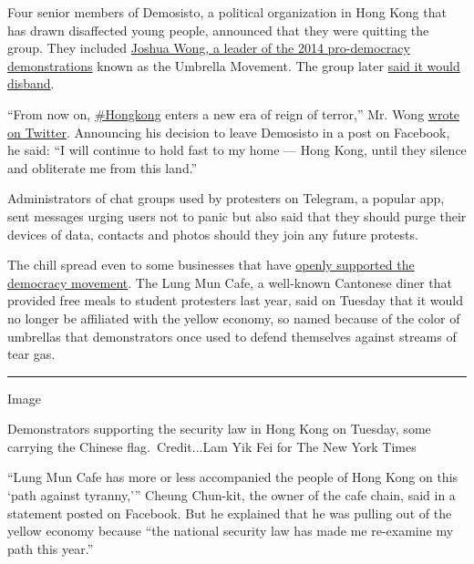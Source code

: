 Four senior members of Demosisto, a political organization in Hong Kong
that has drawn disaffected young people, announced that they were
quitting the group. They included
\href{https://www.nytimes3xbfgragh.onion/2019/10/29/world/asia/joshua-wong-hong-kong-protests.html}{Joshua
Wong, a leader of the 2014 pro-democracy demonstrations} known as the
Umbrella Movement. The group later
\href{https://www.facebookcorewwwi.onion/demosisto/posts/1464823310393153}{said
it would disband}.

``From now on,
\href{https://twitter.com/hashtag/Hongkong?ref_src=twsrc\%5Etfw\%7Ctwcamp\%5Etweetembed\%7Ctwterm\%5E1277794270393643008\%7Ctwgr\%5E\&ref_url=https\%3A\%2F\%2Fscoop.nyt.net\%2Fui\%2Foakarticle\%2F100000007213051\%2Fweb\%2FdqV1egMG0LchnIJbEkRn\&src=hashtag_click}{\#Hongkong}
enters a new era of reign of terror,'' Mr. Wong
\href{https://twitter.com/joshuawongcf/status/1277794270393643008}{wrote
on Twitter}. Announcing his decision to leave Demosisto in a post on
Facebook, he said: ``I will continue to hold fast to my home --- Hong
Kong, until they silence and obliterate me from this land.''

Administrators of chat groups used by protesters on Telegram, a popular
app, sent messages urging users not to panic but also said that they
should purge their devices of data, contacts and photos should they join
any future protests.

The chill spread even to some businesses that have
\href{https://www.nytimes3xbfgragh.onion/2020/01/19/world/asia/hong-kong-protests-yellow-blue.html}{openly
supported the democracy movement}. The Lung Mun Cafe, a well-known
Cantonese diner that provided free meals to student protesters last
year, said on Tuesday that it would no longer be affiliated with the
yellow economy, so named because of the color of umbrellas that
demonstrators once used to defend themselves against streams of tear
gas.

\begin{center}\rule{0.5\linewidth}{\linethickness}\end{center}

Image

Demonstrators supporting the security law in Hong Kong on Tuesday, some
carrying the Chinese flag.~Credit...Lam Yik Fei for The New York Times

``Lung Mun Cafe has more or less accompanied the people of Hong Kong on
this `path against tyranny,''' Cheung Chun-kit, the owner of the cafe
chain, said in a statement posted on Facebook. But he explained that he
was pulling out of the yellow economy because ``the national security
law has made me re-examine my path this year.''

